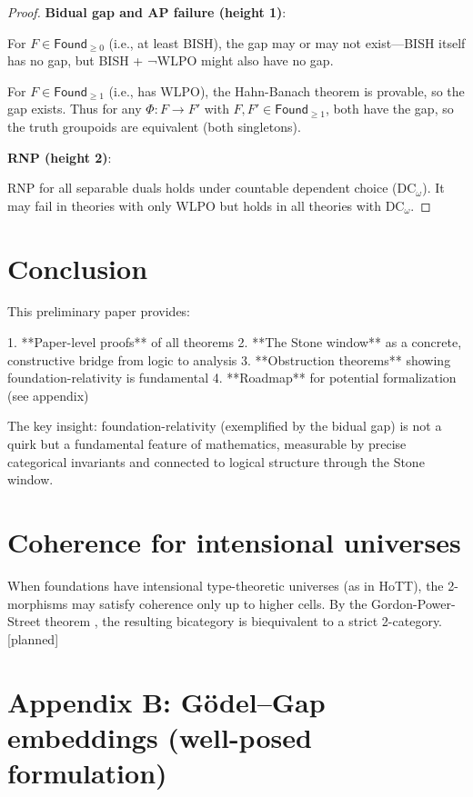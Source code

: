 \documentclass[11pt]{article}
\theoremstyle{definition}
\theoremstyle{remark}
\newcommand{\status}[1]{\textsf{\small\color{blue!60!black}[#1]}}
\newcommand{\Found}{\mathsf{Found}}
\begin{document}
\begin{proof}
\textbf{Bidual gap and AP failure (height 1)}:

For \(F \in \Found_{\geq 0}\) (i.e., at least BISH), the gap may or may not exist---BISH itself has no gap, but BISH + ¬WLPO might also have no gap.

For \(F \in \Found_{\geq 1}\) (i.e., has WLPO), the Hahn-Banach theorem is provable, so the gap exists. Thus for any \(\Phi: F \to F'\) with \(F, F' \in \Found_{\geq 1}\), both have the gap, so the truth groupoids are equivalent (both singletons).

\textbf{RNP (height 2)}:

RNP for all separable duals holds under countable dependent choice (DC\(_\omega\)). It may fail in theories with only WLPO but holds in all theories with DC\(_\omega\).
\end{proof}

\section{Conclusion}\label{sec:conclusion}

This preliminary paper provides:

1. **Paper-level proofs** of all theorems
2. **The Stone window** as a concrete, constructive bridge from logic to analysis
3. **Obstruction theorems** showing foundation-relativity is fundamental
4. **Roadmap** for potential formalization (see appendix)

The key insight: foundation-relativity (exemplified by the bidual gap) is not a quirk but a fundamental feature of mathematics, measurable by precise categorical invariants and connected to logical structure through the Stone window.

\appendix

\section{Coherence for intensional universes}\label{app:coherence}
When foundations have intensional type-theoretic universes (as in HoTT), the 2-morphisms may satisfy coherence only up to higher cells. By the Gordon-Power-Street theorem \cite{GordonPowerStreet95}, the resulting bicategory is biequivalent to a strict 2-category. \status{planned}

\section{Appendix B: Gödel--Gap embeddings (well-posed formulation)}\label{app:godel-gap-wellposed}
\end{document}
